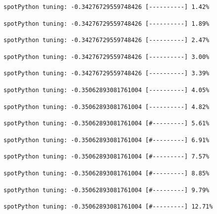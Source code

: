 \documentclass[
  letterpaper,
  DIV=11,
  numbers=noendperiod]{scrreprt}
\begin{document}
\begin{verbatim}
spotPython tuning: -0.34276729559748426 [----------] 1.42% 
\end{verbatim}

\begin{verbatim}
spotPython tuning: -0.34276729559748426 [----------] 1.89% 
\end{verbatim}

\begin{verbatim}
spotPython tuning: -0.34276729559748426 [----------] 2.47% 
\end{verbatim}

\begin{verbatim}
spotPython tuning: -0.34276729559748426 [----------] 3.00% 
\end{verbatim}

\begin{verbatim}
spotPython tuning: -0.34276729559748426 [----------] 3.39% 
\end{verbatim}

\begin{verbatim}
spotPython tuning: -0.35062893081761004 [----------] 4.05% 
\end{verbatim}

\begin{verbatim}
spotPython tuning: -0.35062893081761004 [----------] 4.82% 
\end{verbatim}

\begin{verbatim}
spotPython tuning: -0.35062893081761004 [#---------] 5.61% 
\end{verbatim}

\begin{verbatim}
spotPython tuning: -0.35062893081761004 [#---------] 6.91% 
\end{verbatim}

\begin{verbatim}
spotPython tuning: -0.35062893081761004 [#---------] 7.57% 
\end{verbatim}

\begin{verbatim}
spotPython tuning: -0.35062893081761004 [#---------] 8.85% 
\end{verbatim}

\begin{verbatim}
spotPython tuning: -0.35062893081761004 [#---------] 9.79% 
\end{verbatim}

\begin{verbatim}
spotPython tuning: -0.35062893081761004 [#---------] 12.71% 
\end{verbatim}
\end{document}
